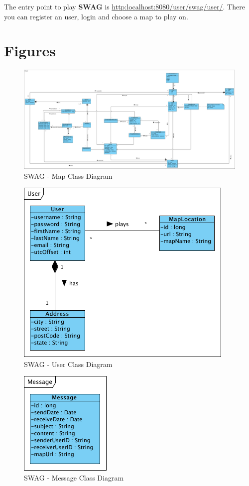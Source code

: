 \documentclass[11pt]{article}
\begin{document}
The entry point to play \textbf{SWAG} is \href{http:localhost:8080/user/swag/user/}{http:localhost:8080/user/swag/user/}. There you can register an user, login and choose a map to play on.

\newpage

\appendix
\section{Figures}

\begin{figure}[h]
\center
\includegraphics[angle=90, scale=0.3]{diagrams/map.png}
\caption{SWAG - Map Class Diagram}
\label{fig:map_cd}
\end{figure}

\begin{figure}[h]
\center
\includegraphics[scale=1]{diagrams/user.png}
\caption{SWAG - User Class Diagram}
\label{fig:user_cd}
\end{figure}

\begin{figure}[h]
\center
\includegraphics[scale=1]{diagrams/message.png}
\caption{SWAG - Message Class Diagram}
\label{fig:message_cd}
\end{figure}
\end{document}
